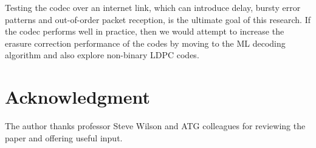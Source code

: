 \documentclass[conference]{IEEEtran}
\begin{document}
Testing the codec over an internet link, which can introduce delay, bursty error patterns and out-of-order packet reception, is the ultimate goal of this research.  If the codec performs well in practice, then we would attempt to increase the erasure correction performance of the codes by moving to the ML decoding algorithm and also explore non-binary LDPC codes.

\section*{Acknowledgment}
The author thanks professor Steve Wilson and ATG colleagues for reviewing the paper and offering useful input.  


%

\end{document}
